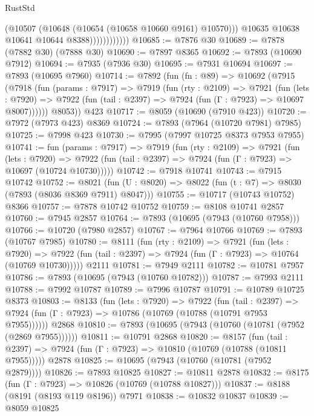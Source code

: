 \begin{lexlean}{RustStd}
\begin{coremodule}
                            (@10507 (@10648 (@10654 (@10658 @10660 @9161) @10570)))
                            @10635
                            @10638
                            @10641
                            @10644
                            @8388))))))))))))
@10685 := @7876 @30
@10689 := @7878 (@7882 @30) (@7888 @30)
@10690 := @7897 @8365
@10692 := @7893 (@10690 @7912)
@10694 := @7935 (@7936 @30)
@10695 := @7931 @10694
@10697 := @7893 (@10695 @7960)
@10714 := @7892
    (fun (fn : @89) =>
    @10692
      (@7915
        (@7918
          (fun (params : @7917) =>
          @7919
            (fun (rty : @2109) =>
            @7921
              (fun (lets : @7920) =>
              @7922 (fun (tail : @2397) => @7924 (fun (Γ : @7923) => @10697 @8007))))))
        @8053))
    @423
@10717 := @8059 (@10690 (@7910 @423))
@10720 := @7972 (@7973 @423) @8369
@10724 := @7893 (@7964 (@10720 @7981) @7985)
@10725 := @7998 @423
@10730 := @7995 (@7997 @10725 @8373 @7953 @7955)
@10741 := fun (params : @7917) =>
  @7919
    (fun (rty : @2109) =>
    @7921
      (fun (lets : @7920) =>
      @7922 (fun (tail : @2397) => @7924 (fun (Γ : @7923) => @10697 (@10724 @10730)))))
@10742 := @7918 @10741
@10743 := @7915 @10742
@10752 := @8021 (fun (U : @8020) => @8022 (fun (t : @7) => @8030 (@7893 (@8036 @8369 @7911) @8047)))
@10755 := @10717 (@10743 @10752) @8366
@10757 := @7878 @10742 @10752
@10759 := @8108 @10741 @2857
@10760 := @7945 @2857
@10764 := @7893 (@10695 (@7943 (@10760 @7958)))
@10766 := @10720 (@7980 @2857)
@10767 := @7964 @10766
@10769 := @7893 (@10767 @7985)
@10780 := @8111
    (fun (rty : @2109) =>
    @7921
      (fun (lets : @7920) =>
      @7922 (fun (tail : @2397) => @7924 (fun (Γ : @7923) => @10764 (@10769 @10730)))))
    @2111
@10781 := @7949 @2111
@10782 := @10781 @7957
@10786 := @7893 (@10695 (@7943 (@10760 @10782)))
@10787 := @7993 @2111
@10788 := @7992 @10787
@10789 := @7996 @10787
@10791 := @10789 @10725 @8373
@10803 := @8133
    (fun (lets : @7920) =>
    @7922
      (fun (tail : @2397) =>
      @7924 (fun (Γ : @7923) => @10786 (@10769 (@10788 (@10791 @7953 @7955))))))
    @2868
@10810 := @7893 (@10695 (@7943 (@10760 (@10781 (@7952 (@2869 @7955))))))
@10811 := @10791 @2868
@10820 := @8157
    (fun (tail : @2397) => @7924 (fun (Γ : @7923) => @10810 (@10769 (@10788 (@10811 @7955)))))
    @2878
@10825 := @10695 (@7943 (@10760 (@10781 (@7952 @2879))))
@10826 := @7893 @10825
@10827 := @10811 @2878
@10832 := @8175 (fun (Γ : @7923) => @10826 (@10769 (@10788 @10827)))
@10837 := @8188 (@8191 (@8193 @119 @8196)) @7971
@10838 := @10832 @10837
@10839 := @8059 @10825

\end{coremodule}
\end{lexlean}
